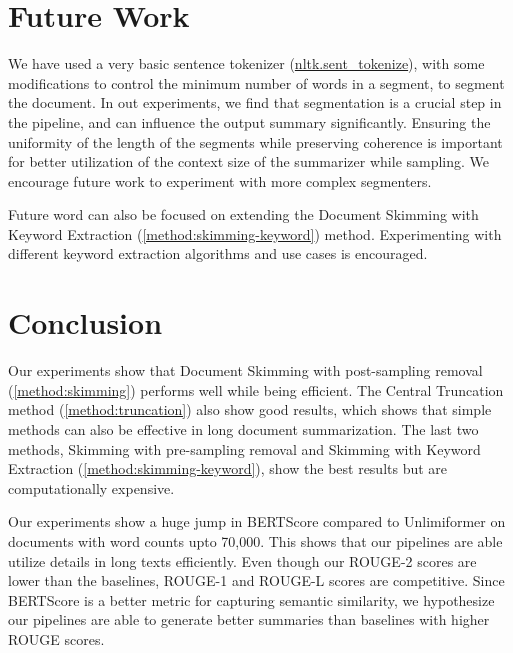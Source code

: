 \section{Future Work}

We have used a very basic sentence tokenizer
(\href{https://www.nltk.org/api/nltk.tokenize.sent_tokenize.html}{nltk.sent\_tokenize}),
with some modifications to control the minimum number of words in a segment,
to segment the document.
In out experiments, we find that segmentation is a crucial step in the pipeline, and can
influence the output summary significantly.
Ensuring the uniformity of the length of the segments while preserving coherence is
important for better utilization of the context size of the summarizer while sampling.
We encourage future work to experiment with more complex segmenters.

Future word can also be focused on extending the Document Skimming with Keyword Extraction
(\ref{method:skimming-keyword}) method.
Experimenting with different keyword extraction algorithms and use cases is encouraged.


\section{Conclusion}
\label{sec:conclusion}

Our experiments show that Document Skimming with post-sampling removal (\ref{method:skimming})
performs well while being efficient.
The Central Truncation method (\ref{method:truncation}) also show good results, which shows
that simple methods can also be effective in long document summarization.
The last two methods, Skimming with pre-sampling removal and Skimming with Keyword Extraction
(\ref{method:skimming-keyword}), show the best results but are computationally expensive.

Our experiments show a huge jump in BERTScore compared to Unlimiformer on
documents with word counts upto 70,000.
This shows that our pipelines are able utilize details in long texts efficiently.
Even though our ROUGE-2 scores are lower than the baselines, ROUGE-1 and ROUGE-L
scores are competitive.
Since BERTScore is a better metric for capturing semantic similarity, we hypothesize
our pipelines are able to generate better summaries than baselines with higher
ROUGE scores.
